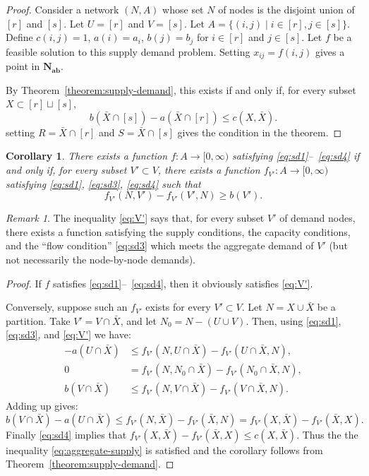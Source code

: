 \documentclass{amsbook}
\newcommand{\bb}{\mathbf b}
\renewcommand{\aa}{\mathbf a}
\newcommand{\NN}{\mathbf N}
\newtheorem{corollary}[theorem]{Corollary}
\theoremstyle{definition}
\theoremstyle{remark}
\newtheorem{remark}[theorem]{Remark}
\begin{document}
\begin{proof}
  Consider a network $(N,A)$ whose set $N$ of nodes is the disjoint union of $[r]$ and $[s]$.
  Let $U=[r]$ and $V=[s]$.
  Let $A=\{(i,j)\mid i\in [r],j\in [s]\}$.
  Define $c(i,j)=1$, $a(i)=a_i$, $b(j)=b_j$ for $i\in [r]$ and $j\in [s]$.
  Let $f$ be a feasible solution to this supply demand problem.
  Setting $x_{ij}=f(i,j)$ gives a point in $\NN_{\aa\bb}$.

  By Theorem~\ref{theorem:supply-demand}, this exists if and only if, for every subset $X\subset [r]\sqcup [s]$,
  \begin{displaymath}
    b(\bar X\cap [s]) - a(\bar X\cap [r]) \leq c(X,\bar X).
  \end{displaymath}
  setting $R=\bar X\cap [r]$ and $S=\bar X\cap [s]$ gives the condition in the theorem.
\end{proof}
\begin{corollary}
  \label{cor:aggregate-supply}
  There exists a function $f:A\to [0,\infty)$ satisfying \eqref{eq:sd1}--~\eqref{eq:sd4} if and only if, for every subset $V'\subset V$, there exists a function $f_{V'}:A\to [0,\infty)$ satisfying \eqref{eq:sd1}, \eqref{eq:sd3}, \eqref{eq:sd4} such that
  \begin{equation}
    \label{eq:V'}
    \tag{SD5}
    f_{V'}(N,V')-f_{V'}(V',N)\geq b(V').
  \end{equation}
\end{corollary}
\begin{remark}
  The inequality \eqref{eq:V'} says that, for every subset $V'$ of demand nodes, there exists a function satisfying the supply conditions, the capacity conditions, and the ``flow condition'' \eqref{eq:sd3} which meets the aggregate demand of $V'$ (but not necessarily the node-by-node demands).
\end{remark}
\begin{proof}
  If $f$ satisfies \eqref{eq:sd1}--~\eqref{eq:sd4}, then it obviously satisfies \eqref{eq:V'}.

  Conversely, suppose such an $f_{V'}$ exists for every $V'\subset V$.
  Let $N=X\cup \bar X$ be a partition.
  Take $V'=V\cap \bar X$, and let $N_0=N-(U\cup V)$.
  Then, using \eqref{eq:sd1}, \eqref{eq:sd3}, and \eqref{eq:V'} we have:
  \begin{align*}
    -a(U\cap\bar X)&\leq f_{V'}(N,U\cap \bar X)-f_{V'}(U\cap\bar X, N),\\
    0 & = f_{V'}(N,N_0\cap \bar X)-f_{V'}(N_0\cap\bar X, N),\\
    b(V\cap \bar X) & \leq f_{V'}(N,V\cap \bar X)-f_{V'}(V\cap\bar X,N).
  \end{align*}
  Adding up gives:
  \begin{displaymath}
    b(V\cap\bar X)-a(U\cap\bar X) \leq f_{V'}(N,\bar X) - f_{V'}(\bar X, N) = f_{V'}(X,\bar X)-f_{V'}(\bar X,X).
  \end{displaymath}
  Finally \eqref{eq:sd4} implies that $f_{V'}(X,\bar X)-f_{V'}(\bar X,X)\leq c(X,\bar X)$.
  Thus the the inequality \eqref{eq:aggregate-supply} is satisfied and the corollary follows from Theorem~\ref{theorem:supply-demand}.
\end{proof}
\end{document}
